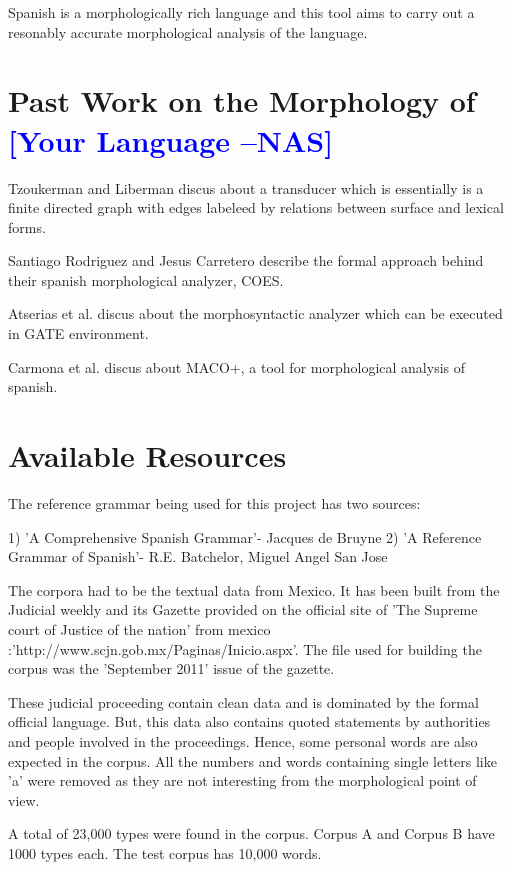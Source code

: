 \documentclass[11pt,letterpaper]{article}
\newcommand{\nascomment}[1]{\textcolor{blue}{\textbf{[#1 --NAS]}}}
\begin{document}
Spanish is a morphologically rich language and this tool aims to carry out a resonably accurate morphological analysis of the language. 

 

\section{Past Work on the Morphology of \nascomment{Your Language}}

Tzoukerman and Liberman discus about a transducer which is essentially is a finite directed graph with edges labeleed by relations between surface and lexical forms. 

Santiago Rodriguez and Jesus Carretero describe the formal approach behind their spanish morphological analyzer, COES. 

Atserias et al. discus about the morphosyntactic analyzer which can be executed in GATE environment.

Carmona et al. discus about MACO+, a tool for morphological analysis of spanish.

\section{Available Resources}

The reference grammar being used for this project has two sources:

1) 'A Comprehensive Spanish Grammar'- Jacques de Bruyne
2) 'A Reference Grammar of Spanish'- R.E. Batchelor, Miguel Angel San Jose

The corpora had to be the textual data from Mexico. It has been built from the Judicial weekly and its Gazette provided on the official site of 'The Supreme court of Justice of the nation' from mexico :'http://www.scjn.gob.mx/Paginas/Inicio.aspx'. The file used for building the corpus was the 'September 2011' issue of the gazette.

These judicial proceeding contain clean data and is dominated by the formal official language. But, this data also contains quoted statements by authorities and people involved in the proceedings. Hence, some personal words are also expected in the corpus. All the numbers and words containing single letters like 'a' were removed as they are not interesting from the morphological point of view. 

A total of 23,000 types were found in the corpus. Corpus A and Corpus B have 1000 types each. The test corpus has 10,000 words.
\end{document}
